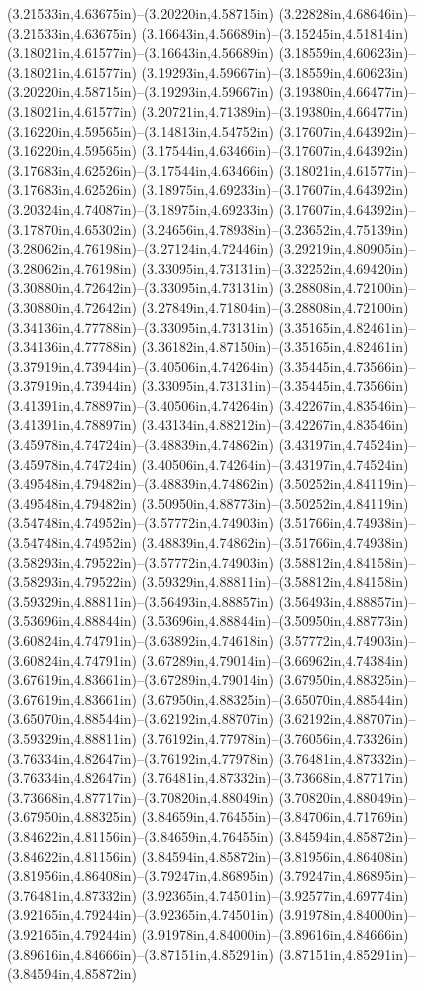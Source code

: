 (3.21533in,4.63675in)--(3.20220in,4.58715in) (3.22828in,4.68646in)--(3.21533in,4.63675in) (3.16643in,4.56689in)--(3.15245in,4.51814in) (3.18021in,4.61577in)--(3.16643in,4.56689in) (3.18559in,4.60623in)--(3.18021in,4.61577in) (3.19293in,4.59667in)--(3.18559in,4.60623in) (3.20220in,4.58715in)--(3.19293in,4.59667in) (3.19380in,4.66477in)--(3.18021in,4.61577in) (3.20721in,4.71389in)--(3.19380in,4.66477in) (3.16220in,4.59565in)--(3.14813in,4.54752in) (3.17607in,4.64392in)--(3.16220in,4.59565in) (3.17544in,4.63466in)--(3.17607in,4.64392in) (3.17683in,4.62526in)--(3.17544in,4.63466in) (3.18021in,4.61577in)--(3.17683in,4.62526in) (3.18975in,4.69233in)--(3.17607in,4.64392in) (3.20324in,4.74087in)--(3.18975in,4.69233in) (3.17607in,4.64392in)--(3.17870in,4.65302in) (3.24656in,4.78938in)--(3.23652in,4.75139in) (3.28062in,4.76198in)--(3.27124in,4.72446in) (3.29219in,4.80905in)--(3.28062in,4.76198in) (3.33095in,4.73131in)--(3.32252in,4.69420in) (3.30880in,4.72642in)--(3.33095in,4.73131in) (3.28808in,4.72100in)--(3.30880in,4.72642in) (3.27849in,4.71804in)--(3.28808in,4.72100in) (3.34136in,4.77788in)--(3.33095in,4.73131in) (3.35165in,4.82461in)--(3.34136in,4.77788in) (3.36182in,4.87150in)--(3.35165in,4.82461in) (3.37919in,4.73944in)--(3.40506in,4.74264in) (3.35445in,4.73566in)--(3.37919in,4.73944in) (3.33095in,4.73131in)--(3.35445in,4.73566in) (3.41391in,4.78897in)--(3.40506in,4.74264in) (3.42267in,4.83546in)--(3.41391in,4.78897in) (3.43134in,4.88212in)--(3.42267in,4.83546in) (3.45978in,4.74724in)--(3.48839in,4.74862in) (3.43197in,4.74524in)--(3.45978in,4.74724in) (3.40506in,4.74264in)--(3.43197in,4.74524in) (3.49548in,4.79482in)--(3.48839in,4.74862in) (3.50252in,4.84119in)--(3.49548in,4.79482in) (3.50950in,4.88773in)--(3.50252in,4.84119in) (3.54748in,4.74952in)--(3.57772in,4.74903in) (3.51766in,4.74938in)--(3.54748in,4.74952in) (3.48839in,4.74862in)--(3.51766in,4.74938in) (3.58293in,4.79522in)--(3.57772in,4.74903in) (3.58812in,4.84158in)--(3.58293in,4.79522in) (3.59329in,4.88811in)--(3.58812in,4.84158in) (3.59329in,4.88811in)--(3.56493in,4.88857in) (3.56493in,4.88857in)--(3.53696in,4.88844in) (3.53696in,4.88844in)--(3.50950in,4.88773in) (3.60824in,4.74791in)--(3.63892in,4.74618in) (3.57772in,4.74903in)--(3.60824in,4.74791in) (3.67289in,4.79014in)--(3.66962in,4.74384in) (3.67619in,4.83661in)--(3.67289in,4.79014in) (3.67950in,4.88325in)--(3.67619in,4.83661in) (3.67950in,4.88325in)--(3.65070in,4.88544in) (3.65070in,4.88544in)--(3.62192in,4.88707in) (3.62192in,4.88707in)--(3.59329in,4.88811in) (3.76192in,4.77978in)--(3.76056in,4.73326in) (3.76334in,4.82647in)--(3.76192in,4.77978in) (3.76481in,4.87332in)--(3.76334in,4.82647in) (3.76481in,4.87332in)--(3.73668in,4.87717in) (3.73668in,4.87717in)--(3.70820in,4.88049in) (3.70820in,4.88049in)--(3.67950in,4.88325in) (3.84659in,4.76455in)--(3.84706in,4.71769in) (3.84622in,4.81156in)--(3.84659in,4.76455in) (3.84594in,4.85872in)--(3.84622in,4.81156in) (3.84594in,4.85872in)--(3.81956in,4.86408in) (3.81956in,4.86408in)--(3.79247in,4.86895in) (3.79247in,4.86895in)--(3.76481in,4.87332in) (3.92365in,4.74501in)--(3.92577in,4.69774in) (3.92165in,4.79244in)--(3.92365in,4.74501in) (3.91978in,4.84000in)--(3.92165in,4.79244in) (3.91978in,4.84000in)--(3.89616in,4.84666in) (3.89616in,4.84666in)--(3.87151in,4.85291in) (3.87151in,4.85291in)--(3.84594in,4.85872in) 